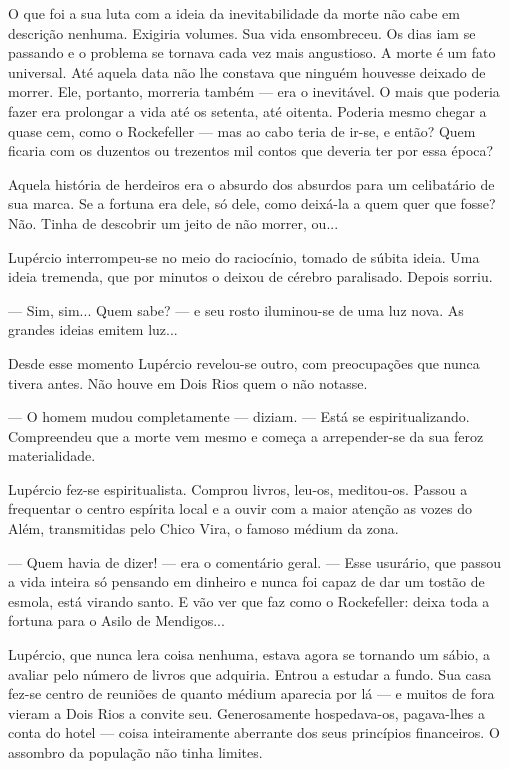 O que foi a sua luta com a ideia da inevitabilidade da morte não cabe em
descrição nenhuma. Exigiria volumes. Sua vida ensombreceu. Os dias iam
se passando e o problema se tornava cada vez mais angustioso. A morte é
um fato universal. Até aquela data não lhe constava que ninguém houvesse
deixado de morrer. Ele, portanto, morreria também --- era o inevitável.
O mais que poderia fazer era prolongar a vida até os setenta, até
oitenta. Poderia mesmo chegar a quase cem, como o Rockefeller --- mas ao
cabo teria de ir-se, e então? Quem ficaria com os duzentos ou trezentos
mil contos que deveria ter por essa época?

Aquela história de herdeiros era o absurdo dos absurdos para um
celibatário de sua marca. Se a fortuna era dele, só dele, como deixá-la
a quem quer que fosse? Não. Tinha de descobrir um jeito de não morrer,
ou...

Lupércio interrompeu-se no meio do raciocínio, tomado de súbita ideia.
Uma ideia tremenda, que por minutos o deixou de cérebro paralisado.
Depois sorriu.

--- Sim, sim... Quem sabe? --- e seu rosto iluminou-se de uma luz nova.
As grandes ideias emitem luz...

Desde esse momento Lupércio revelou-se outro, com preocupações que nunca
tivera antes. Não houve em Dois Rios quem o não notasse.

--- O homem mudou completamente --- diziam. --- Está se
espiritualizando. Compreendeu que a morte vem mesmo e começa a
arrepender-se da sua feroz materialidade.

Lupércio fez-se espiritualista. Comprou livros, leu-os, meditou-os.
Passou a frequentar o centro espírita local e a ouvir com a maior
atenção as vozes do Além, transmitidas pelo Chico Vira, o famoso médium
da zona.

--- Quem havia de dizer! --- era o comentário geral. --- Esse usurário,
que passou a vida inteira só pensando em dinheiro e nunca foi capaz de
dar um tostão de esmola, está virando santo. E vão ver que faz como o
Rockefeller: deixa toda a fortuna para o Asilo de Mendigos...

Lupércio, que nunca lera coisa nenhuma, estava agora se tornando um
sábio, a avaliar pelo número de livros que adquiria. Entrou a estudar a
fundo. Sua casa fez-se centro de reuniões de quanto médium aparecia por
lá --- e muitos de fora vieram a Dois Rios a convite seu. Generosamente
hospedava-os, pagava-lhes a conta do hotel --- coisa inteiramente
aberrante dos seus princípios financeiros. O assombro da população não
tinha limites.

